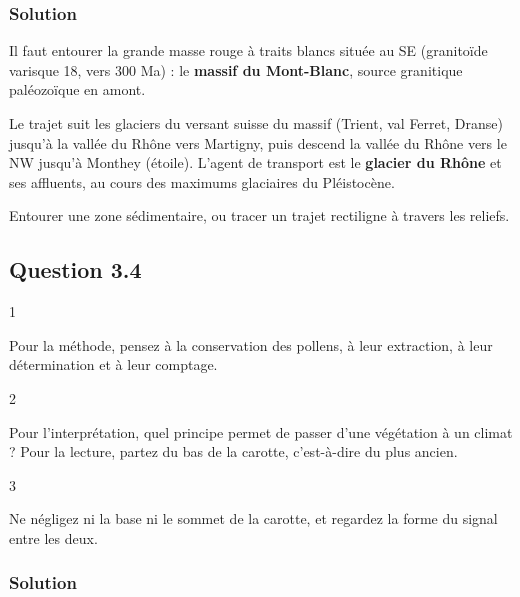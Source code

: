 \documentclass[11pt,a4paper]{article}
\begin{document}
\hypertarget{solution-30}{%
\subsubsection{Solution}\label{solution-30}}

Il faut entourer la grande masse rouge à traits blancs située au SE (granitoïde varisque 18, vers 300 Ma) : le \textbf{massif du Mont-Blanc}, source granitique paléozoïque en amont.

Le trajet suit les glaciers du versant suisse du massif (Trient, val Ferret, Dranse) jusqu'à la vallée du Rhône vers Martigny, puis descend la vallée du Rhône vers le NW jusqu'à Monthey (étoile). L'agent de transport est le \textbf{glacier du Rhône} et ses affluents, au cours des maximums glaciaires du Pléistocène.

\begin{piege}

Entourer une zone sédimentaire, ou tracer un trajet rectiligne à travers les reliefs.

\end{piege}

\hypertarget{question-3.4}{%
\subsection{Question 3.4}\label{question-3.4}}

\begin{indication}{1}

Pour la méthode, pensez à la conservation des pollens, à leur extraction, à leur détermination et à leur comptage.

\end{indication}

\begin{indication}{2}

Pour l'interprétation, quel principe permet de passer d'une végétation à un climat ? Pour la lecture, partez du bas de la carotte, c'est-à-dire du plus ancien.

\end{indication}

\begin{indication}{3}

Ne négligez ni la base ni le sommet de la carotte, et regardez la forme du signal entre les deux.

\end{indication}

\hypertarget{solution-31}{%
\subsubsection{Solution}\label{solution-31}}
\end{document}
